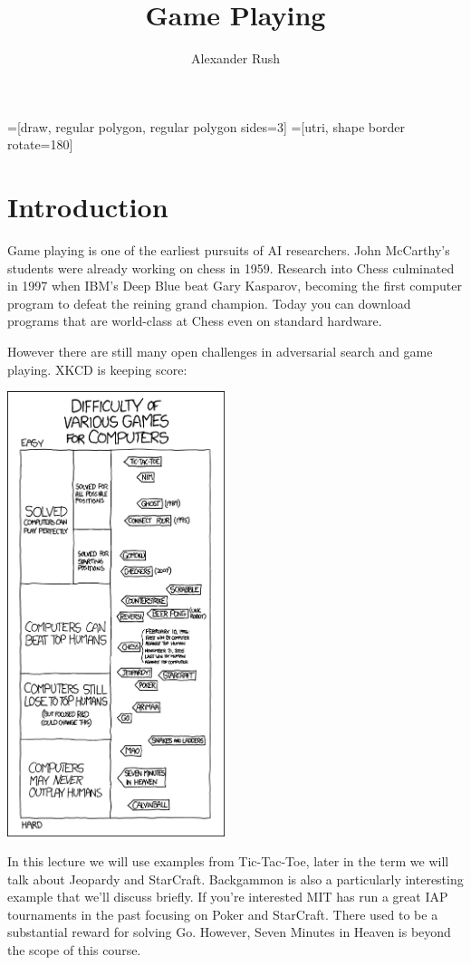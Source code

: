 \documentclass[11pt]{article}
\title{Game Playing}
\author{Alexander Rush}
\date{}
\begin{document}
\MakeScribeTop{}

=[draw, regular polygon, regular polygon sides=3]
=[utri, shape border rotate=180]

\tableofcontents

\section{Introduction}

Game playing is one of the earliest pursuits of AI researchers. John McCarthy's students were already working on chess in 1959. Research into Chess culminated in 1997 when IBM's Deep Blue beat Gary Kasparov, becoming the first computer program to defeat the reining grand champion. Today you can download programs that are world-class at Chess even on standard hardware. 

However there are still many open challenges in adversarial search and game playing. XKCD is keeping score:

 
\begin{center}
  \includegraphics[height=13cm]{pics/game_ais}
\end{center}

\noindent In this lecture we will use examples from Tic-Tac-Toe, later in the term we will talk about Jeopardy and StarCraft. Backgammon is also a particularly interesting example that we'll discuss briefly. If you're interested MIT has run a great IAP tournaments in the past focusing on Poker and StarCraft. There used to be a substantial reward for solving Go. However, Seven Minutes in Heaven is beyond the scope of this course.
\end{document}

